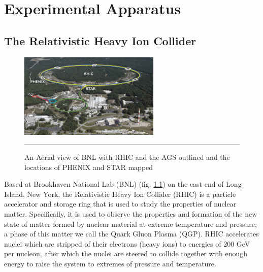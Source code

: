 
\chapter{Experimental Apparatus} %
\label{apparatus}

\section{The Relativistic Heavy Ion Collider}
\begin{figure}[htbp]
  \centering
    \includegraphics[width=0.6\textwidth]{Figures/RHIC-aerial-HR.jpg}
    \rule{35em}{0.5pt}
  \caption[An Aerial view of BNL]{An Aerial view of BNL with RHIC and the AGS outlined and the locations of PHENIX and STAR mapped}
  \label{fig:Aerial RHIC}
\end{figure}
\indent Based at Brookhaven National Lab (BNL) (fig. \ref{fig:Aerial RHIC}) on the east end of Long Island, New York, the Relativistic Heavy Ion Collider (RHIC) is a particle accelerator and storage ring that is used to study the properties of nuclear matter. Specifically, it is used to observe the properties and formation of the new state of matter formed by nuclear material at extreme temperature and pressure; a phase of this matter we call the Quark Gluon Plasma (QGP). RHIC accelerates nuclei which are stripped of their electrons (heavy ions) to energies of 200 GeV per nucleon, after which the nuclei are steered to collide together with enough energy to raise the system to extremes of pressure and temperature.

